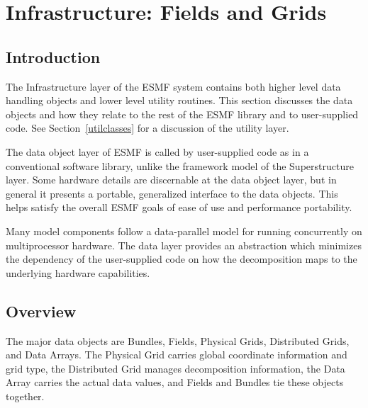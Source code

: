 \section{Infrastructure: Fields and Grids}
\label{sec:fieldclasses}

\subsection{Introduction}

The Infrastructure layer of the ESMF system contains both 
higher level data handling objects and 
lower level utility routines.
This section discusses the data objects and how they relate to
the rest of the ESMF library and to user-supplied code.  
See Section~\ref{utilclasses} for a discussion of the utility layer.

The data object layer of ESMF is called by user-supplied code
as in a conventional software library, unlike the framework model
of the Superstructure layer.
Some hardware details are discernable at the data object layer, 
but in general it presents a portable, generalized interface to the
data objects.
This helps satisfy the overall ESMF goals of ease of use and
performance portability.

Many model components follow a data-parallel model for running
concurrently on multiprocessor hardware.
The data layer provides an abstraction which
minimizes the dependency of the user-supplied code on 
how the decomposition maps to the underlying hardware
capabilities.  


\subsection{Overview}

The major data objects are Bundles,
Fields, Physical Grids, Distributed Grids, and Data Arrays.
The Physical Grid carries global coordinate information and grid type,
the Distributed Grid manages decomposition information, 
the Data Array carries the actual
data values, and Fields and Bundles tie these objects together.

